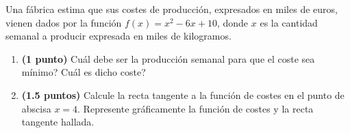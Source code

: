 
Una fábrica estima que sus costes de producción, expresados en miles de
euros, vienen dados por la función $f(x)=x^2-6x+10$, donde $x$ es la cantidad
semanal a producir expresada en miles de kilogramos.
\begin{enumerate}[label=\alph*)]
  \item \textbf{(1 punto)} \textquestiondown{}Cuál debe ser la producción
  semanal para que el coste sea mínimo? \textquestiondown{}Cuál es dicho coste?
  \item \textbf{(1.5 puntos)} Calcule la recta tangente a la función de costes
  en el punto de abscisa $x=4$. Represente gráficamente la función de costes
  y la recta tangente hallada.
\end{enumerate}
